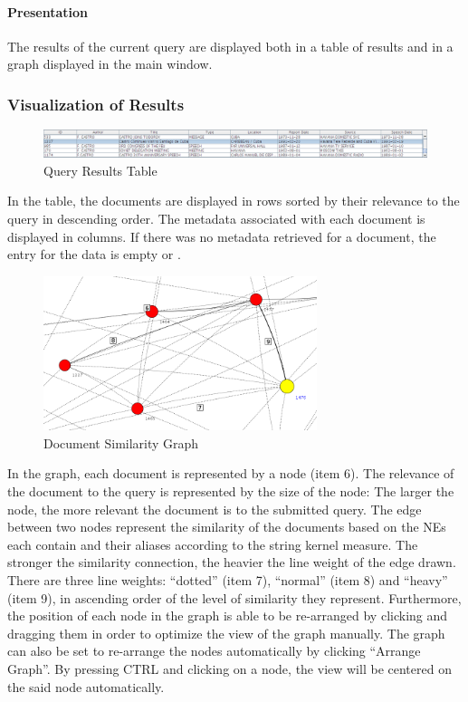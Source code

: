 \paragraph{Presentation}
The results of the current query are displayed both in a table of results and in a graph displayed in the main window.

\subsubsection{Visualization of Results}
\begin{figure}[ht]
\centering
\caption{Query Results Table}
\includegraphics[width=160mm]{table.png}
\end{figure}

In the table, the documents are displayed in rows sorted by their relevance to the query in descending order. The metadata associated with each document is displayed in columns. If there was no metadata retrieved for a document, the entry for the data is empty or .

\begin{figure}[ht]
\centering
\caption{Document Similarity Graph}
\includegraphics[width=80mm]{nodecloseup.png}
\end{figure}

In the graph, each document is represented by a node (item 6). The relevance of the document to the query is represented by the size of the node: The larger the node, the more relevant the document is to the submitted query. The edge between two nodes represent the similarity of the documents based on the NEs each contain and their aliases according to the string kernel measure. The stronger the similarity connection, the heavier the line weight of the edge drawn. There are three line weights: ``dotted'' (item 7), ``normal'' (item 8) and ``heavy'' (item 9), in ascending order of the level of similarity they represent. Furthermore, the position of each node in the graph is able to be re-arranged by clicking and dragging them in order to optimize the view of the graph manually. The graph can also be set to re-arrange the nodes automatically by clicking ``Arrange Graph''. By pressing CTRL and clicking on a node, the view will be centered on the said node automatically.

